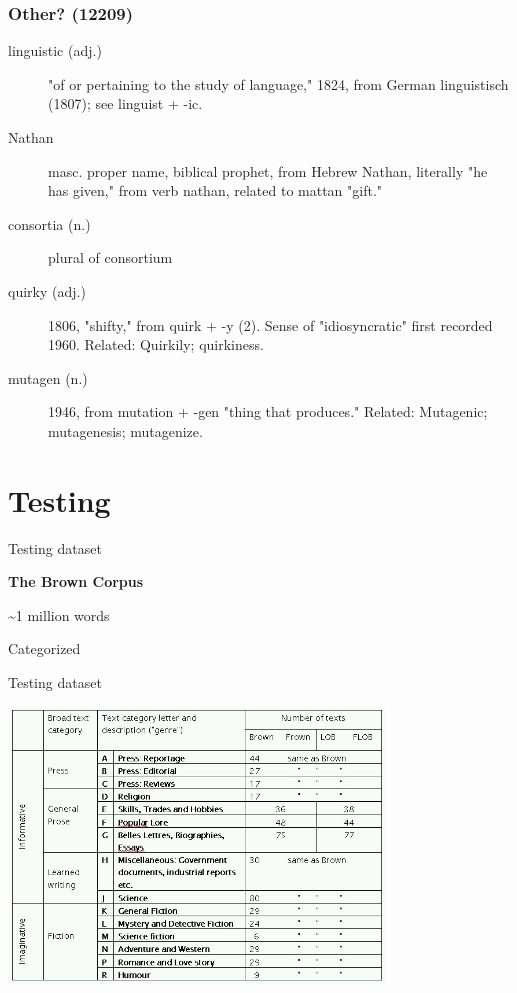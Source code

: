 \documentclass[10pt]{beamer}
\begin{document}
\begin{frame}[fragile]
  \frametitle{Other? (12209)}

  \begin{description}
    \item[linguistic (adj.)] "of or pertaining to the study of language," 1824, from German linguistisch (1807); see linguist + -ic.
    \item[Nathan] masc. proper name, biblical prophet, from Hebrew Nathan, literally "he has given," from verb nathan, related to mattan "gift."
    \item[consortia (n.)] plural of consortium
    \item[quirky (adj.)] 1806, "shifty," from quirk + -y (2). Sense of "idiosyncratic" first recorded 1960. Related: Quirkily; quirkiness.
    \item[mutagen (n.)] 1946, from mutation + -gen "thing that produces." Related: Mutagenic; mutagenesis; mutagenize.




  \end{description}
\end{frame}

\section{Testing}

\begin{frame}[fragile]{Testing dataset}
  \pause

  \textbf{The Brown Corpus}

  \pause

  \textasciitilde 1 million words

  \pause

  Categorized
\end{frame}

\begin{frame}[fragile]{Testing dataset}
    \centerline{\includegraphics[width=10cm]{browncats.jpg}}

\end{frame}
\end{document}
